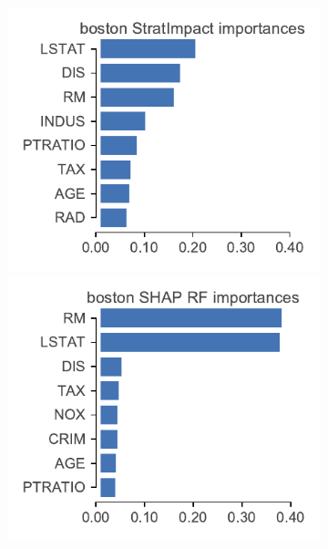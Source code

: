 \documentclass[twoside,11pt]{article}
\begin{document}
\begin{figure}
\centering
\begin{subfigure}{1\textwidth}
    \centering
\includegraphics[scale=0.6]{images/boston-features.pdf}
\includegraphics[scale=0.6]{images/boston-features-shap-rf.pdf}
\vspace{-2mm}\vspace{3mm}
\end{subfigure}%
\hfill
\begin{subfigure}{1\textwidth}
    \centering

\end{subfigure}
\end{figure}
\end{document}
